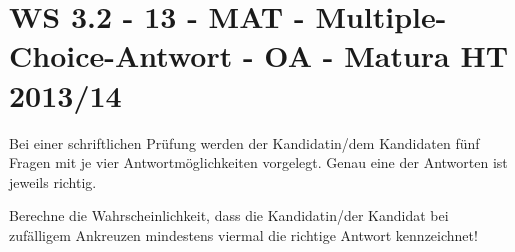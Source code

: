 \section{WS 3.2 - 13 - MAT - Multiple-Choice-Antwort - OA - Matura HT 2013/14}

\begin{beispiel}[WS 3.2]{1} %
				Bei einer schriftlichen Prüfung werden der Kandidatin/dem Kandidaten fünf Fragen mit je vier Antwortmöglichkeiten vorgelegt. Genau eine der Antworten ist jeweils richtig.
				
				Berechne die Wahrscheinlichkeit, dass die Kandidatin/der Kandidat bei zufälligem Ankreuzen mindestens viermal die richtige Antwort kennzeichnet!
				
\end{beispiel}